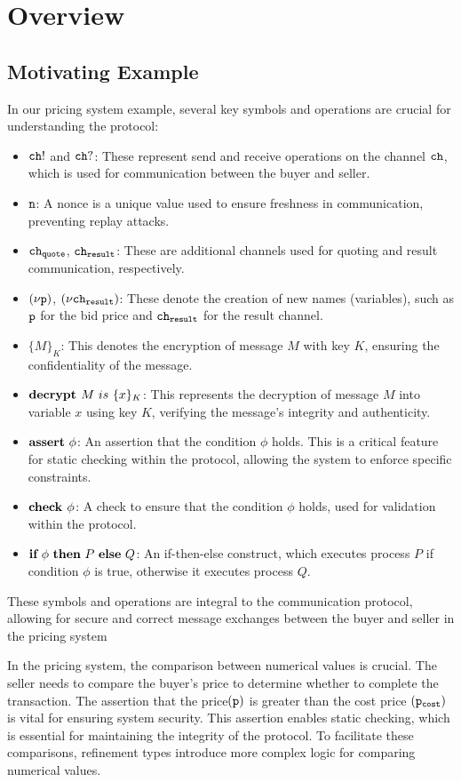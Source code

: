 \documentclass[master,english]{kuisthesis}
\theoremstyle{definition}
\begin{document}
\section{Overview}\label{sec-structure}
\subsection{Motivating Example}
In our pricing system example, several key symbols and operations are crucial for understanding the protocol:
\begin{itemize}
  \item \({\tt ch}!\) and \({\tt ch}?\): These represent send and receive operations on the channel \({\tt ch}\), which is used for communication between the buyer and seller.
  \item \({\tt n}\): A nonce is a unique value used to ensure freshness in communication, preventing replay attacks.
  \item \({\tt ch_{quote}}\), \({\tt ch_{result}}\): These are additional channels used for quoting and result communication, respectively.
  \item \((\nu {{\tt p}})\), \((\nu {{\tt ch_{result}}})\): These denote the creation of new names (variables), such as \({\tt p}\) for the bid price and \({\tt ch_{result}}\) for the result channel.
  \item \(\{M\}_K\): This denotes the encryption of message \(M\) with key \(K\), ensuring the confidentiality of the message.
  \item \(\textbf{decrypt }{M}~is~\{{x}\}_{K}\): This represents the decryption of message \(M\) into variable \(x\) using key \(K\), verifying the message's integrity and authenticity.
  \item \(\mathbf{assert}\ {\phi}\): An assertion that the condition \(\phi\) holds. This is a critical feature for static checking within the protocol, allowing the system to enforce specific constraints.
  \item \(\textbf{check }{\phi}\): A check to ensure that the condition \(\phi\) holds, used for validation within the protocol.
  \item \(\textbf{if}\ {\phi}\ \textbf{then}\ {P} \ \textbf{else}\ {Q}\): An if-then-else construct, which executes process \(P\) if condition \(\phi\) is true, otherwise it executes process \(Q\).
\end{itemize}

These symbols and operations are integral to the communication protocol, allowing for secure and correct message exchanges between the buyer and seller in the pricing system

In the pricing system, the comparison between numerical values is crucial. The seller needs to compare the buyer's price  to determine whether to complete the transaction. The assertion that the  price$({\tt p})$ is greater than the cost price $({\tt p_{cost}})$ is vital for ensuring system security. This assertion enables static checking, which is essential for maintaining the integrity of the protocol. To facilitate these comparisons, refinement types introduce more complex logic for comparing numerical values.
\end{document}
